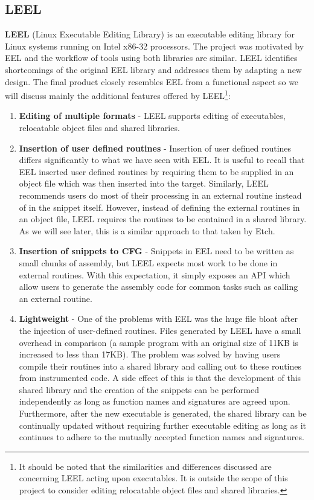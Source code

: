 \subsection{LEEL}

\textbf{LEEL} (Linux Executable Editing Library) is an executable editing library for Linux systems running on Intel x86-32 processors\cite{leel}. The project was motivated by EEL and the workflow of tools using both libraries are similar. LEEL identifies shortcomings of the original EEL library and addresses them by adapting a new design. The final product closely resembles EEL from a functional aspect so we will discuss mainly the additional features offered by LEEL\footnote{It should be noted that the similarities and differences discussed are concerning LEEL acting upon executables. It is outside the scope of this project to consider editing relocatable object files and shared libraries.}:

\begin{enumerate}
 \item \textbf{Editing of multiple formats} - LEEL supports editing of executables, relocatable object files and shared libraries.
 \item \textbf{Insertion of user defined routines} - Insertion of user defined routines differs significantly to what we have seen with EEL. It is useful to recall that EEL inserted user defined routines by requiring them to be supplied in an object file which was then inserted into the target. Similarly, LEEL recommends users do most of their processing in an external routine instead of in the snippet itself. However, instead of defining the external routines in an object file, LEEL requires the routines to be contained in a shared library. As we will see later, this is a similar approach to that taken by Etch.
 \item \textbf{Insertion of snippets to CFG} - Snippets in EEL need to be written as small chunks of assembly, but LEEL expects most work to be done in external routines. With this expectation, it simply exposes an API which allow users to generate the assembly code for common tasks such as calling an external routine.
 \item \textbf{Lightweight} - One of the problems with EEL was the huge file bloat after the injection of user-defined routines. Files generated by LEEL have a small overhead in comparison (a sample program with an original size of 11KB is increased to less than 17KB). The problem was solved by having users compile their routines into a shared library and calling out to these routines from instrumented code. A side effect of this is that the development of this shared library and the creation of the snippets can be performed independently as long as function names and signatures are agreed upon. Furthermore, after the new executable is generated, the shared library can be continually updated without requiring further executable editing as long as it continues to adhere to the mutually accepted function names and signatures.
\end{enumerate}

